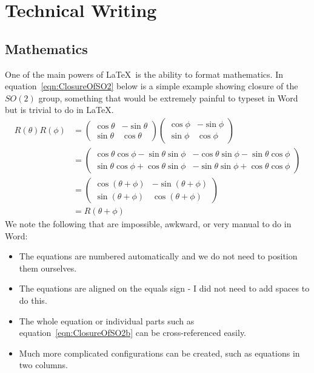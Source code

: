\section{Technical Writing}
\label{sec:TechnicalWriting}

\subsection{Mathematics}
\label{subsec:Mathematics}

One of the main powers of \LaTeX\ is the ability to format mathematics. In equation~\eqref{eqn:ClosureOfSO2} below is a simple example showing closure of the $SO(2)$ group, something that would be extremely painful to typeset in Word but is trivial to do in \LaTeX.
\begin{subequations}
\begin{align}
	R(\theta)R(\phi) &= 
	\left( \begin{array}{cc}
		\cos\theta & -\sin\theta \\
		\sin\theta & \cos\theta
	\end{array} \right)
	\left( \begin{array}{cc}
		\cos\phi & -\sin\phi \\
		\sin\phi & \cos\phi
	\end{array} \right)\label{eqn:ClosureOfSO2a}  \\
	&= \left( \begin{array}{cc}
		\cos\theta\cos\phi - \sin\theta\sin\phi & -\cos\theta\sin\phi -\sin\theta\cos\phi \\
		\sin\theta\cos\phi + \cos\theta\sin\phi & -\sin\theta\sin\phi + \cos\theta\cos\phi
	\end{array} \right)\label{eqn:ClosureOfSO2b}  \\
	&= \left( \begin{array}{cc}
		\cos(\theta + \phi) & -\sin(\theta + \phi) \\
		\sin(\theta + \phi) & \cos(\theta + \phi)
	\end{array} \right)\label{eqn:ClosureOfSO2c}  \\
	&= R(\theta + \phi)\label{eqn:ClosureOfSO2d}
\end{align}
\label{eqn:ClosureOfSO2}
\end{subequations}
We note the following that are impossible, awkward, or very manual to do in Word:

\begin{itemize}
	\item The equations are numbered automatically and we do not need to position them ourselves.
	\item The equations are aligned on the equals sign - I did not need to add spaces to do this.
	\item The whole equation or individual parts such as equation~\eqref{eqn:ClosureOfSO2b} can be cross-referenced easily.
	\item Much more complicated configurations can be created, such as equations in two columns.
\end{itemize}

